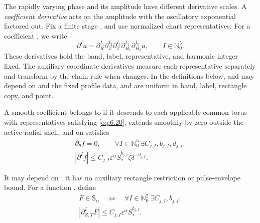The rapidly varying phase and its amplitude have different derivative scales.
A \emph{coefficient derivative} acts on the amplitude with the oscillatory
exponential factored out. Fix a finite stage , and use
normalized chart representatives. For a coefficient
, we write
\[
  \partial^Ia
  =\partial_R^{I_1}\partial_Z^{I_2}\partial_T^{I_3}
   \partial_{H_1}^{I_4}\partial_{H_2}^{I_5}a,
  \qquad I\in\mathbb N_0^5.
\]
These derivatives hold the band, label, representative, and harmonic integer
fixed. The auxiliary coordinate derivatives measure each representative
separately and transform by the chain rule when 
changes. In the definitions below,  and
 may depend on
 and the fixed profile data, and are uniform in band,
label, rectangle copy, and point.

\begin{definition}\label{def:6.4}
A smooth coefficient  belongs to
 if it descends to each applicable common
torus with representatives satisfying \eqref{eq:6.20}, extends smoothly by
zero outside the active radial shell, and on
 satisfies
\begin{equation}
  \begin{gathered}
    \partial_\theta f=0,
    \qquad
    \forall I\in\mathbb N_0^5\ \exists C_{j,I},b_{j,I},d_{j,I}:\\
    |\partial^If|\le C_{j,I}\varepsilon^\alpha
      S_*^{b_{j,I}}\zeta\delta^{-d_{j,I}}.
  \end{gathered}
  \tag{6.24}\label{eq:6.24}
\end{equation}

%
It may depend on ; it has no auxiliary rectangle
restriction or pulse-envelope bound. For a function
, define
\begin{equation}
  \begin{gathered}
    F\in\mathsf S_\alpha
    \quad\Longleftrightarrow\quad
    \forall I\in\mathbb N_0^2\ \exists C_{j,I},b_{j,I}:\\
    |\partial_{Z,T}^IF|\le C_{j,I}\varepsilon^\alpha S_*^{b_{j,I}}.
  \end{gathered}
  \tag{6.25}\label{eq:6.25}
\end{equation}
\end{definition}

